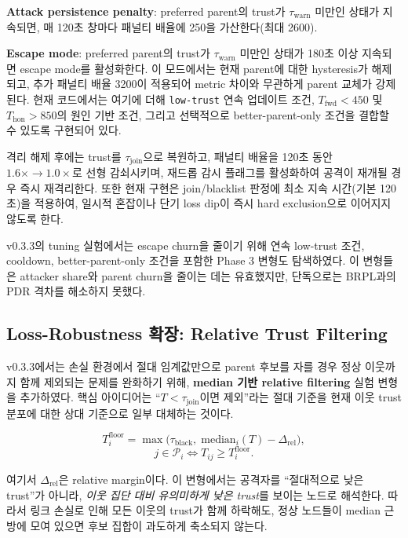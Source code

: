 \documentclass[12pt,a4paper]{article}
\begin{document}
\textbf{Attack persistence penalty}: preferred parent의 trust가
$\tau_\text{warn}$ 미만인 상태가 지속되면, 매 120초 창마다
패널티 배율에 250을 가산한다(최대 2600).

\textbf{Escape mode}: preferred parent의 trust가 $\tau_\text{warn}$ 미만인 상태가
180초 이상 지속되면 escape mode를 활성화한다.
이 모드에서는 현재 parent에 대한 hysteresis가 해제되고,
추가 패널티 배율 3200이 적용되어 metric 차이와 무관하게 parent 교체가 강제된다.
현재 코드에서는 여기에 더해
\texttt{low-trust} 연속 업데이트 조건,
$T_\text{fwd}<450$ 및 $T_\text{hon}>850$의 원인 기반 조건,
그리고 선택적으로 better-parent-only 조건을 결합할 수 있도록 구현되어 있다.

격리 해제 후에는 trust를 $\tau_\text{join}$으로 복원하고,
패널티 배율을 120초 동안 $1.6\times \rightarrow 1.0\times$로 선형 감쇠시키며,
재드롭 감시 플래그를 활성화하여 공격이 재개될 경우 즉시 재격리한다.
또한 현재 구현은 join/blacklist 판정에 최소 지속 시간(기본 120초)을 적용하여,
일시적 혼잡이나 단기 loss dip이 즉시 hard exclusion으로 이어지지 않도록 한다.

v0.3.3의 tuning 실험에서는 escape churn을 줄이기 위해
연속 low-trust 조건, cooldown, better-parent-only 조건을 포함한 Phase 3 변형도 탐색하였다.
이 변형들은 attacker share와 parent churn을 줄이는 데는 유효했지만,
단독으로는 BRPL과의 PDR 격차를 해소하지 못했다.

\subsection{Loss-Robustness 확장: Relative Trust Filtering}

v0.3.3에서는 손실 환경에서 절대 임계값만으로 parent 후보를 자를 경우
정상 이웃까지 함께 제외되는 문제를 완화하기 위해,
\textbf{median 기반 relative filtering} 실험 변형을 추가하였다.
핵심 아이디어는 ``$T < \tau_\text{join}$이면 제외''라는 절대 기준을
현재 이웃 trust 분포에 대한 상대 기준으로 일부 대체하는 것이다.

\begin{equation}
  T^\text{floor}_i = \max\!\bigl(\tau_\text{black},\; \mathrm{median}_i(T) - \Delta_\text{rel}\bigr),
\end{equation}
\begin{equation}
  j \in \mathcal{P}_i \iff T_{ij} \ge T^\text{floor}_i.
\end{equation}

여기서 $\Delta_\text{rel}$은 relative margin이다. 이 변형에서는 공격자를
``절대적으로 낮은 trust''가 아니라, \emph{이웃 집단 대비 유의미하게 낮은 trust}를
보이는 노드로 해석한다. 따라서 링크 손실로 인해 모든 이웃의 trust가 함께 하락해도,
정상 노드들이 median 근방에 모여 있으면 후보 집합이 과도하게 축소되지 않는다.
\end{document}
